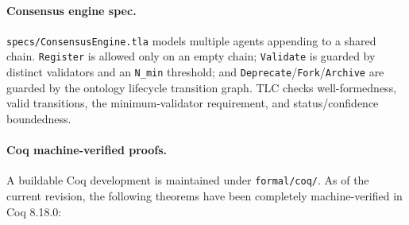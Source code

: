 \paragraph{Consensus engine spec.}
\texttt{specs/ConsensusEngine.tla} models multiple agents appending to a shared
chain.  \texttt{Register} is allowed only on an empty chain; \texttt{Validate}
is guarded by distinct validators and an \texttt{N\_min} threshold; and
\texttt{Deprecate}/\texttt{Fork}/\texttt{Archive} are guarded by the ontology
lifecycle transition graph.  TLC checks well-formedness, valid transitions, the
minimum-validator requirement, and status/confidence boundedness.

\paragraph{Coq machine-verified proofs.}\label{app:coq}
A buildable Coq development is maintained under \texttt{formal/coq/}. As of the current revision, the following theorems have been completely machine-verified in Coq 8.18.0:

